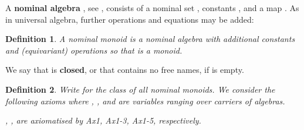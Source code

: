 \documentclass[runningheads,a4paper]{llncs}
\newtheorem{definition}{Theorem}[section]
\newtheorem{definition}{Definition}[section]
\begin{document}
A \textbf{nominal algebra} , see \cite[Def
4.13]{gabb-math:nom-alg}, consists of a nominal set , constants
, and a map . As in universal algebra,
further operations and equations may be added:
\begin{definition}
  A \emph{nominal monoid} is a nominal algebra  with
  additional constants  and (equivariant) operations
   so that  is a monoid.
\end{definition}
We say that  is \textbf{closed}, or that  contains no free
names, if  is empty. 
\begin{definition}
  Write  for the class of all nominal monoids.  We
  consider the following axioms where , ,
  and  are variables ranging over carriers of algebras.
       
  ,
  ,  are axiomatised by Ax1, Ax1-3,
  Ax1-5, respectively.
\end{definition}
\end{document}

